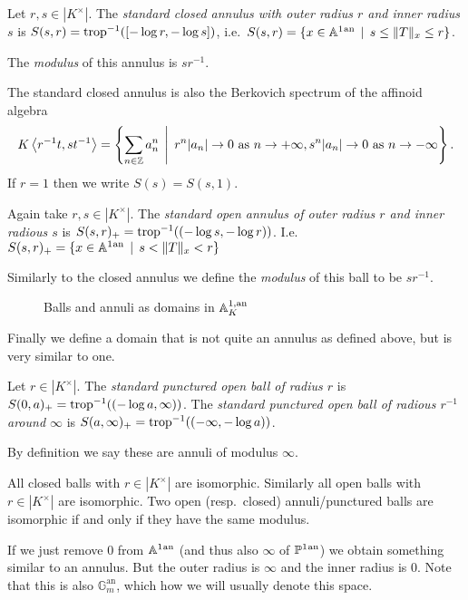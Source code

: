 \begin{definition}
	Let $r, s \in |K^{\times }|$. 
	The \emph{standard closed annulus with outer radius  $r$ and inner radius  $s$}  is $S(s, r) = \operatorname{trop}^{-1}([-\log r, -\log s])$, i.e.\ $S(s, r) = \{x \in \aff^{1}\an \st s \le \|T\|_x \le r\} $.

	The \emph{modulus} of this annulus is $s r^{-1}$. 
\end{definition}
The standard closed annulus is also the Berkovich spectrum of the affinoid algebra \[
	K\left<r^{-1}t, st^{-1} \right> = \left\{\sum_{n \in \Z}^{} a_n ^{n} \st r^{n}|a_n| \to 0 \text{ as } n \to +\infty, s^n |a_n| \to 0 \text{ as } n \to - \infty\right\} 
.\] 
If $r = 1$ then we write $S(s) = S(s,1)$. 
\begin{definition}
	Again take $r, s \in |K^{\times }|$. 
	The \emph{standard open annulus of outer radius $r$ and inner radious $s$} is $S(s,r)_+ = \operatorname{trop}^{-1}((-\log s, -\log r))$. 
	I.e.\ $S(s,r)_+ = \{x \in \aff^{1}\an \st s < \|T\|_x < r\} $

	Similarly to the closed annulus we define the \emph{modulus} of this ball to be $s r^{-1}$. 
\end{definition}

\begin{figure}[ht]
    \centering
    \caption{Balls and annuli as domains in $\mathbb{A}^{1, \text{an}}_K$}
    \label{fig:affine-line-ball-annuli}
\end{figure}

Finally we define a domain that is not quite an annulus as defined above, but is very similar to one. 
\begin{definition}
	Let $r \in |K^{\times }|$. The \emph{standard punctured open ball of radius $r$ } is $S(0, a)_+ = \operatorname{trop}^{-1}((-\log a, \infty))$. 
	The \emph{standard punctured open ball of radious $r^{-1}$ around $\infty$} is $S(a, \infty)_+ = \operatorname{trop}^{-1}((-\infty, -\log a))$. 

	By definition we say these are annuli of modulus $\infty$. 
\end{definition}

All closed balls with $r \in |K^{\times }|$ are isomorphic. Similarly all open balls with $r \in |K^{\times }|$ are isomorphic. 
Two open (resp.\ closed) annuli/punctured balls are isomorphic if and only if they have the same modulus. 

\begin{remark}
	If we just remove $0$ from $\mathbb{A}^{1}{}^{\text{an}}$ (and thus also $\infty$ of $\mathbb{P}^{1}{}^{\text{an}}$) we obtain something similar to an annulus. But the outer radius is $\infty$ and the inner radius is $0$. 
	Note that this is also $\mathbb G^{\mathrm{an}}_m$, which how we will usually denote this space. 
\end{remark}


